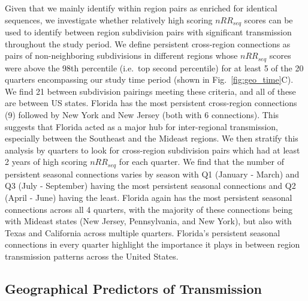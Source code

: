 \documentclass[11pt, letterpaper, oneside]{article}
\begin{document}
Given that we mainly identify within region pairs as enriched for identical sequences, we investigate whether relatively high scoring $nRR_{seq}$ scores can be used to identify between region subdivision pairs with significant transmission throughout the study period.
We define persistent cross-region connections as pairs of non-neighboring subdivisions in different regions whose $nRR_{seq}$ scores were above the 98th percentile (i.e.\ top second percentile) for at least 5 of the 20 quarters encompassing our study time period (shown in Fig.\ \ref{fig:geo_time}C).
We find 21 between subdivision pairings meeting these criteria, and all of these are between US states.
Florida has the most persistent cross-region connections (9) followed by New York and New Jersey (both with 6 connections).
This suggests that Florida acted as a major hub for inter-regional transmission, especially between the Southeast and the Mideast regions.
We then stratify this analysis by quarters to look for cross-region subdivision pairs which had at least 2 years of high scoring $nRR_{seq}$ for each quarter.
We find that the number of persistent seasonal connections varies by season with Q1 (January - March) and Q3 (July - September) having the most persistent seasonal connections and Q2 (April - June) having the least.
Florida again has the most persistent seasonal connections across all 4 quarters, with the majority of these connections being with Mideast states (New Jersey, Pennsylvania, and New York), but also with Texas and California across multiple quarters.
Florida's persistent seasonal connections in every quarter highlight the importance it plays in between region transmission patterns across the United States.

\subsection{Geographical Predictors of Transmission}
\end{document}
